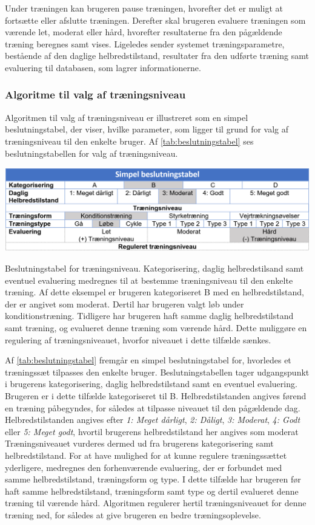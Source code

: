 Under træningen kan brugeren pause træningen, hvorefter det er muligt at fortsætte eller afslutte træningen. Derefter skal brugeren evaluere træningen som værende let, moderat eller hård, hvorefter resultaterne fra den pågældende træning beregnes samt vises. Ligeledes sender systemet træningsparametre, bestående af den daglige helbredstilstand, resultater fra den udførte træning samt evaluering til databasen, som lagrer informationerne. 

\subsubsection*{Algoritme til valg af træningsniveau}
Algoritmen til valg af træningsniveau er illustreret som en simpel beslutningstabel, der viser, hvilke parameter, som ligger til grund for valg af træningsniveau til den enkelte bruger. Af \autoref{tab:beslutningstabel} ses beslutningstabellen for valg af træningsniveau.

\begin{table}[H]
\centering
\includegraphics[width=1\textwidth]{figures/aktivitetsdiagram/beslutningstabel}
\caption{Beslutningstabel for træningsniveau. Kategorisering, daglig helbredstilsand samt eventuel evaluering medregnes til at bestemme træningsniveau til den enkelte træning. Af dette eksempel er brugeren kategoriseret B med en helbredstilstand, der er angivet som moderat. Dertil har brugeren valgt løb under konditionstræning. Tidligere har brugeren haft samme daglig helbredstilstand samt træning, og evalueret denne træning som værende hård. Dette muliggøre en regulering af træningsniveauet, hvorfor niveauet i dette tilfælde sænkes.}
\label{tab:beslutningstabel}
\end{table} 

\noindent
Af \autoref{tab:beslutningstabel} fremgår en simpel beslutningstabel for, hvorledes et træningssæt tilpasses den enkelte bruger. Beslutningstabellen tager udgangspunkt i brugerens kategorisering, daglig helbredstilstand samt en eventuel evaluering. Brugeren er i dette tilfælde kategoriseret til B. Helbredstilstanden angives førend en træning påbegyndes, for således at tilpasse niveauet til den pågældende dag. Helbredstilstanden angives efter \textit{1: Meget dårligt}, \textit{2: Dåligt}, \textit{3: Moderat}, \textit{4: Godt} eller \textit{5: Meget godt}, hvortil brugerens helbredstilstand her angives som moderat
Træningsniveauet vurderes dermed ud fra brugerens kategorisering samt helbredstilstand. 
For at have mulighed for at kunne regulere træningssættet yderligere, medregnes den forhenværende evaluering, der er forbundet med samme helbredstilstand, træningsform og type. I dette tilfælde har brugeren før haft samme helbredstilstand, træningsform samt type og dertil evalueret denne træning til værende hård. Algoritmen regulerer hertil træningsniveauet for denne træning ned, for således at give brugeren en bedre træningsoplevelse. 
